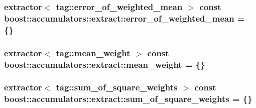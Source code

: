 \subsubsection[{error\+\_\+of\+\_\+weighted\+\_\+mean}]{\setlength{\rightskip}{0pt plus 5cm}extractor$<$ {\bf tag\+::error\+\_\+of\+\_\+weighted\+\_\+mean} $>$ const boost\+::accumulators\+::extract\+::error\+\_\+of\+\_\+weighted\+\_\+mean = \{\}}\label{namespaceboost_1_1accumulators_1_1extract_aa736c1893587667ab411a7d91493e2a5}
\hypertarget{namespaceboost_1_1accumulators_1_1extract_aece73c78440e8b94bdcb26286cf53d99}{}
\subsubsection[{mean\+\_\+weight}]{\setlength{\rightskip}{0pt plus 5cm}extractor$<$ {\bf tag\+::mean\+\_\+weight} $>$ const boost\+::accumulators\+::extract\+::mean\+\_\+weight = \{\}}\label{namespaceboost_1_1accumulators_1_1extract_aece73c78440e8b94bdcb26286cf53d99}
\hypertarget{namespaceboost_1_1accumulators_1_1extract_a3dfd926200a900b5e56b582630bca0a4}{}
\subsubsection[{sum\+\_\+of\+\_\+square\+\_\+weights}]{\setlength{\rightskip}{0pt plus 5cm}extractor$<$ {\bf tag\+::sum\+\_\+of\+\_\+square\+\_\+weights} $>$ const boost\+::accumulators\+::extract\+::sum\+\_\+of\+\_\+square\+\_\+weights = \{\}}\label{namespaceboost_1_1accumulators_1_1extract_a3dfd926200a900b5e56b582630bca0a4}
